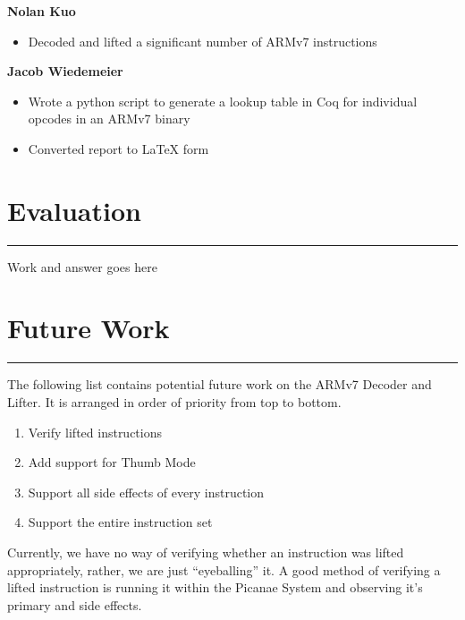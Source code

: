 \documentclass{article}
\begin{document}
\textbf{Nolan Kuo}
\begin{itemize}
	\item Decoded and lifted a significant number of ARMv7 instructions\\
\end{itemize}

\textbf{Jacob Wiedemeier}
\begin{itemize}
	\item Wrote a python script to generate a lookup table in Coq for individual opcodes in an ARMv7 binary
	\item Converted report to LaTeX form\\
\end{itemize}

\pagebreak

\section*{Evaluation}
\vspace{0.3cm}
\hrule
\vspace{0.3cm}
Work and answer goes here

\pagebreak

\section*{Future Work}
\vspace{0.3cm}
\hrule
\vspace{0.3cm}

The following list contains potential future work on the ARMv7 Decoder and Lifter. It is arranged in order of priority from top to bottom.\\
\begin{enumerate}
	\item Verify lifted instructions
	\item Add support for Thumb Mode
	\item Support all side effects of every instruction
	\item Support the entire instruction set\\
\end{enumerate}

Currently, we have no way of verifying whether an instruction was lifted appropriately, rather, we are just “eyeballing” it. A good method of verifying a lifted instruction is running it within the Picanae System and observing it’s primary and side effects.\\
\end{document}
